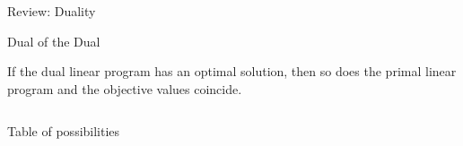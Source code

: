 \pagestyle{empty}



\begin{frame}{Review: Duality}

 
\end{frame}





\begin{frame}{Dual of the Dual}

 \begin{corollary}
   \label{thr:5}
   If the dual linear program has an optimal solution, then so does the
   primal linear program and the objective values coincide.
 \end{corollary}

  \begin{columns}
    \begin{column}{.5\textwidth}
      
    \end{column}
    \begin{column}{.5\textwidth}
      
    \end{column}       
  \end{columns}
\end{frame}





\begin{frame}{Table of possibilities}

  \begin{columns}
    \begin{column}{.5\textwidth}
      
    \end{column}
    \begin{column}{.5\textwidth}
      
    \end{column}       
  \end{columns}
\end{frame}





